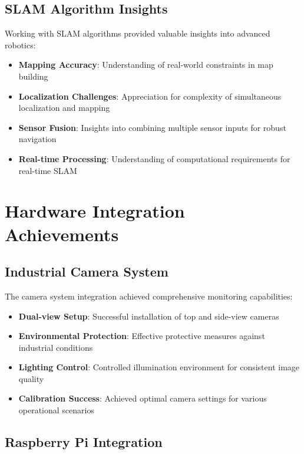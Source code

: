 \documentclass{book}
\begin{document}
\subsection{SLAM Algorithm Insights}

\par\noindent Working with SLAM algorithms provided valuable insights into advanced robotics:

\begin{itemize}
\item \textbf{Mapping Accuracy}: Understanding of real-world constraints in map building
\item \textbf{Localization Challenges}: Appreciation for complexity of simultaneous localization and mapping
\item \textbf{Sensor Fusion}: Insights into combining multiple sensor inputs for robust navigation
\item \textbf{Real-time Processing}: Understanding of computational requirements for real-time SLAM
\end{itemize}

\section{Hardware Integration Achievements}

\subsection{Industrial Camera System}

\par\noindent The camera system integration achieved comprehensive monitoring capabilities:

\begin{itemize}
\item \textbf{Dual-view Setup}: Successful installation of top and side-view cameras
\item \textbf{Environmental Protection}: Effective protective measures against industrial conditions
\item \textbf{Lighting Control}: Controlled illumination environment for consistent image quality
\item \textbf{Calibration Success}: Achieved optimal camera settings for various operational scenarios
\end{itemize}

\subsection{Raspberry Pi Integration}
\end{document}
